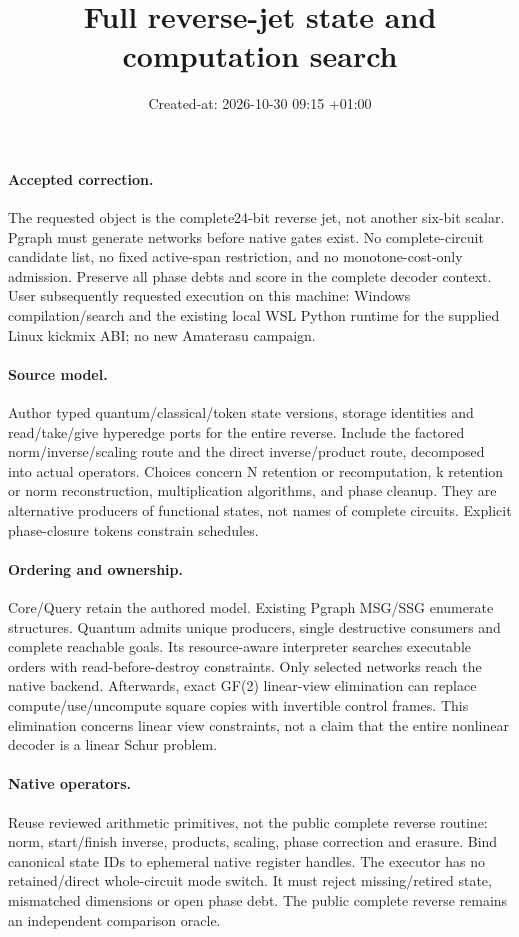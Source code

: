 \documentclass{article}
\title{Full reverse-jet state and computation search}
\date{Created-at: 2026-10-30 09:15 +01:00}
\begin{document}
\maketitle
\paragraph{Accepted correction.} The requested object is the complete24-bit
reverse jet, not another six-bit scalar. Pgraph must generate networks before
native gates exist. No complete-circuit candidate list, no fixed active-span
restriction, and no monotone-cost-only admission. Preserve all phase debts and
score in the complete decoder context. User subsequently requested execution on
this machine: Windows compilation/search and the existing local WSL Python
runtime for the supplied Linux kickmix ABI; no new Amaterasu campaign.
\paragraph{Source model.} Author typed quantum/classical/token state versions,
storage identities and read/take/give hyperedge ports for the entire reverse.
Include the factored norm/inverse/scaling route and the direct inverse/product
route, decomposed into actual operators. Choices concern N retention or
recomputation, k retention or norm reconstruction, multiplication algorithms,
and phase cleanup. They are alternative producers of functional states, not
names of complete circuits. Explicit phase-closure tokens constrain schedules.
\paragraph{Ordering and ownership.} Core/Query retain the authored model.
Existing Pgraph MSG/SSG enumerate structures. Quantum admits unique producers,
single destructive consumers and complete reachable goals. Its resource-aware
interpreter searches executable orders with read-before-destroy constraints.
Only selected networks reach the native backend. Afterwards, exact GF(2)
linear-view elimination can replace compute/use/uncompute square copies with
invertible control frames. This elimination concerns linear view constraints,
not a claim that the entire nonlinear decoder is a linear Schur problem.
\paragraph{Native operators.} Reuse reviewed arithmetic primitives, not the
public complete reverse routine: norm, start/finish inverse, products, scaling,
phase correction and erasure. Bind canonical state IDs to ephemeral native
register handles. The executor has no retained/direct whole-circuit mode switch.
It must reject missing/retired state, mismatched dimensions or open phase debt.
The public complete reverse remains an independent comparison oracle.
\end{document}
